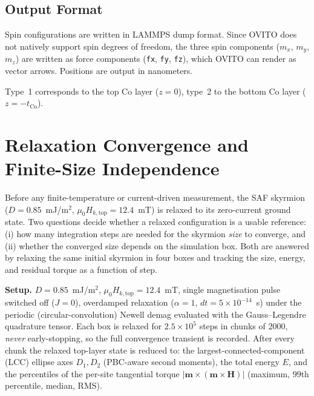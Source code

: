 \documentclass[11pt,a4paper]{article}
\newcommand{\mb}[1]{\mathbf{#1}}
\newcommand{\tCo}{t_{\text{Co}}}
\begin{document}
\subsection{Output Format}

Spin configurations are written in LAMMPS dump format. Since OVITO
does not natively support spin degrees of freedom, the three spin
components ($m_x$, $m_y$, $m_z$) are written as force components
(\texttt{fx}, \texttt{fy}, \texttt{fz}), which OVITO can render as
vector arrows. Positions are output in nanometers.

Type~1 corresponds to the top Co layer ($z = 0$), type~2 to the
bottom Co layer ($z = -\tCo$).



\newpage
\section{Relaxation Convergence and Finite-Size Independence}
\label{sec:relax-convergence}

Before any finite-temperature or current-driven measurement, the
SAF skyrmion ($D=0.85$~mJ/m$^2$,
$\mu_0H_{k,\mathrm{top}}=12.4$~mT) is relaxed to its zero-current
ground state. Two
questions decide whether a relaxed configuration is a usable
reference: (i) how many integration steps are needed for the
skyrmion \emph{size} to converge, and (ii) whether the converged size
depends on the simulation box. Both are answered by relaxing the same
initial skyrmion in four boxes and tracking the size, energy, and
residual torque as a function of step.

\textbf{Setup.} $D=0.85$~mJ/m$^2$,
$\mu_0H_{k,\mathrm{top}}=12.4$~mT, single magnetisation pulse
switched off ($J=0$), overdamped relaxation ($\alpha=1$,
$dt=5\times10^{-14}$~s)
under the periodic (circular-convolution) Newell demag evaluated with
the Gauss--Legendre quadrature tensor. Each box is relaxed for
$2.5\times10^{5}$ steps in chunks of $2000$, \emph{never}
early-stopping, so the full convergence transient is recorded. After
every chunk the relaxed top-layer state is reduced to: the
largest-connected-component (LCC) ellipse axes $D_1,D_2$ (PBC-aware
second moments), the total energy $E$, and the percentiles of the
per-site tangential torque $|\mb{m}\times(\mb{m}\times\mb{H})|$
(maximum, $99$th percentile, median, RMS).
\end{document}

